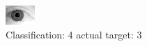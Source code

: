\begin{figure}[h!]
\begin{center}
\includegraphics[width=0.60\columnwidth]{figures/ID2196_class_4_target_3.png}
\end{center}
\caption{ Classification: 4 actual target: 3}
\label{fig:ID2196_class_4_target_3}
\end{figure}
